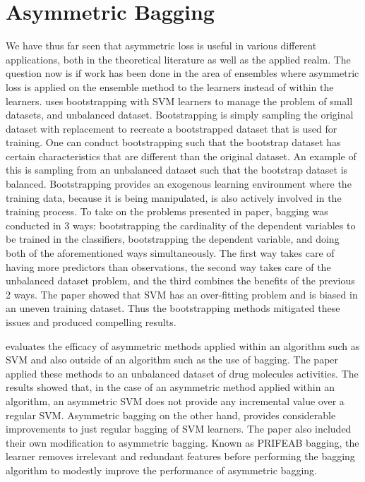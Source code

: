 \section{Asymmetric Bagging}
We have thus far seen that asymmetric loss is useful in various different applications, both in the theoretical literature as well as the applied realm. The question now is if work has been done in the area of ensembles where asymmetric loss is applied on the ensemble method to the learners instead of within the learners. \citet{Tao06} uses bootstrapping with SVM learners to manage the problem of small datasets, and unbalanced dataset. Bootstrapping is simply sampling the original dataset with replacement to recreate a bootstrapped dataset that is used for training. One can conduct bootstrapping such that the bootstrap dataset has certain characteristics that are different than the original dataset. An example of this is sampling from an unbalanced dataset such that the bootstrap dataset is balanced. Bootstrapping provides an exogenous learning environment where the training data, because it is being manipulated, is also actively involved in the training process. To take on the problems presented in \citet{Tao06} paper, bagging was conducted in 3 ways: bootstrapping the cardinality of the dependent variables to be trained in the classifiers, bootstrapping the dependent variable, and doing both of the aforementioned ways simultaneously. The first way takes care of having more predictors than observations, the second way takes care of the unbalanced dataset problem, and the third combines the benefits of the previous 2 ways. The paper showed that SVM has an over-fitting problem and is biased in an uneven training dataset. Thus the bootstrapping methods mitigated these issues and produced compelling results. 

 \citet{Li08} evaluates the efficacy of asymmetric methods applied within an algorithm such as SVM and also outside of an algorithm such as the use of bagging. The paper applied these methods to an unbalanced dataset of drug molecules activities. The results showed that, in the case of an asymmetric method applied within an algorithm, an asymmetric SVM does not provide any incremental value over a regular SVM. Asymmetric bagging on the other hand, provides considerable improvements to just regular bagging of SVM learners. The paper also included their own modification to asymmetric bagging. Known as PRIFEAB bagging, the learner removes irrelevant and redundant features before performing the bagging algorithm to modestly improve the performance of asymmetric bagging. 

